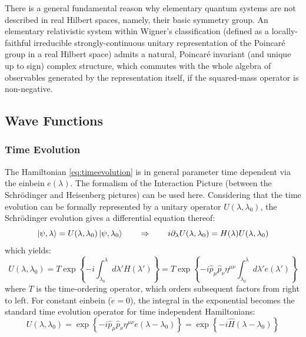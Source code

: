 \documentclass[twoside,a4paper,11pt]{article}
\numberwithin{equation}{section}
\begin{document}
There is a general fundamental reason why elementary quantum systems are not described in real Hilbert spaces, namely, their basic symmetry group. An elementary relativistic system within Wigner's classification (defined as a locally-faithful irreducible strongly-continuous unitary representation of the Poincaré group in a real Hilbert space) admits a natural, Poincaré invariant (and unique up to sign) complex structure, which commutes with the whole algebra of observables generated by the representation itself, if the squared-mass operator is non-negative. 



\subsection{Wave Functions}

\subsubsection{Time Evolution}
The Hamiltonian \ref{eq:timeevolution} is in general parameter time dependent via the einbein $e(\lambda)$. The formalism of the Interaction Picture (between the Schr{\"o}dinger and Heisenberg pictures) can be used here. Considering that the time evolution can be formally represented by a unitary operator $U(\lambda, \lambda_0) $, the Schr{\"o}dinger evolution gives a differential equation thereof:
\begin{equation}
\ket{\psi, \lambda} = U(\lambda, \lambda_0) \ket{\psi, \lambda_0} \qquad \Rightarrow \qquad i \partial_\lambda U(\lambda, \lambda_0) = H(\lambda) U(\lambda, \lambda_0)
\end{equation}
which yields:
\begin{equation}
U(\lambda, \lambda_0) = T \exp \left\lbrace -i \int_{\lambda_0}^{\lambda} d\lambda' H(\lambda') \right\rbrace = T \exp \left\lbrace  -i \hat{p}_\mu \hat{p}_\nu \eta^{\mu\nu}  \int_{\lambda_0}^{\lambda} d\lambda' e(\lambda') \right\rbrace 
\end{equation}
where $T$ is the time-ordering operator, which orders subsequent factors from right to left. For constant einbein ($\dot{e} = 0$), the integral in the exponential becomes the standard time evolution operator for time independent Hamiltonians:
\begin{equation}
U(\lambda,\lambda_0)=\exp \left\lbrace  -i \hat{p}_\mu \hat{p}_\nu \eta^{\mu\nu} e (\lambda - \lambda_0) \right\rbrace =  \exp \left\lbrace  -i \hat{H} (\lambda - \lambda_0) \right\rbrace
\end{equation} 
\end{document}
